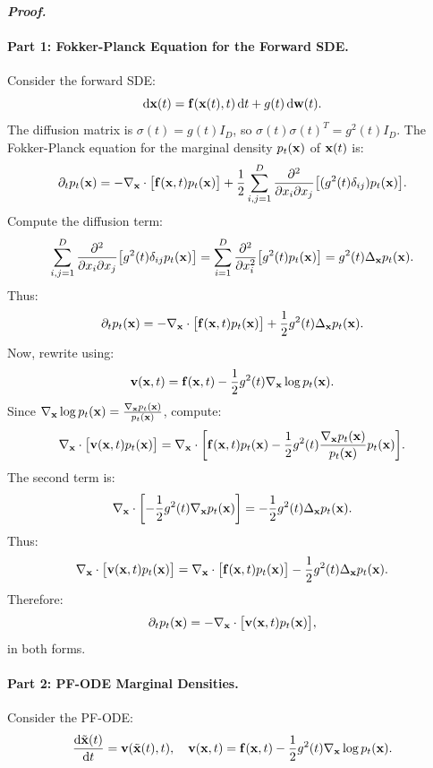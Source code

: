 \paragraph{\textit{Proof.}}
\paragraph{Part 1: Fokker-Planck Equation for the Forward SDE.}

Consider the forward SDE:
\[
\mathop{}\!\mathrm{d} {\mathbf{x}}(t) = {\mathbf{f}}({\mathbf{x}}(t), t)  \mathop{}\!\mathrm{d} t + g(t)  \mathop{}\!\mathrm{d} {\mathbf{w}}(t).
\]
The diffusion matrix is $\sigma(t) = g(t) I_D$, so $\sigma(t) \sigma(t)^T = g^2(t) I_D$. The Fokker-Planck equation for the marginal density $p_t({\mathbf{x}})$ of ${\mathbf{x}}(t)$ is:
\[
\partial_t p_t({\mathbf{x}}) = -\nabla_{{\mathbf{x}}} \cdot \bigl[ {\mathbf{f}}({\mathbf{x}}, t) p_t({\mathbf{x}}) \bigr] + \frac{1}{2} \sum_{i,j=1}^D \frac{\partial^2}{\partial x_i \partial x_j} \bigl[ (g^2(t) \delta_{ij}) p_t({\mathbf{x}}) \bigr].
\]
Compute the diffusion term:
\[
\sum_{i,j=1}^D \frac{\partial^2}{\partial x_i \partial x_j} \bigl[ g^2(t) \delta_{ij} p_t({\mathbf{x}}) \bigr] = \sum_{i=1}^D \frac{\partial^2}{\partial x_i^2} \bigl[ g^2(t) p_t({\mathbf{x}}) \bigr] = g^2(t) \Delta_{{\mathbf{x}}} p_t({\mathbf{x}}).
\]
Thus:
\[
\partial_t p_t({\mathbf{x}}) = -\nabla_{{\mathbf{x}}} \cdot \bigl[ {\mathbf{f}}({\mathbf{x}}, t) p_t({\mathbf{x}}) \bigr] + \frac{1}{2} g^2(t) \Delta_{{\mathbf{x}}} p_t({\mathbf{x}}).
\]
Now, rewrite using:
\[
{\mathbf{v}}({\mathbf{x}}, t) = {\mathbf{f}}({\mathbf{x}}, t) - \frac{1}{2} g^2(t) \nabla_{{\mathbf{x}}} \log p_t({\mathbf{x}}).
\]
Since $\nabla_{{\mathbf{x}}} \log p_t({\mathbf{x}}) = \frac{\nabla_{{\mathbf{x}}} p_t({\mathbf{x}})}{p_t({\mathbf{x}})}$, compute:
\[
\nabla_{{\mathbf{x}}} \cdot \bigl[ {\mathbf{v}}({\mathbf{x}}, t) p_t({\mathbf{x}}) \bigr] = \nabla_{{\mathbf{x}}} \cdot \biggl[ {\mathbf{f}}({\mathbf{x}}, t) p_t({\mathbf{x}}) - \frac{1}{2} g^2(t) \frac{\nabla_{{\mathbf{x}}} p_t({\mathbf{x}})}{p_t({\mathbf{x}})} p_t({\mathbf{x}}) \biggr].
\]
The second term is:
\[
\nabla_{{\mathbf{x}}} \cdot \biggl[ -\frac{1}{2} g^2(t) \nabla_{{\mathbf{x}}} p_t({\mathbf{x}}) \biggr] = -\frac{1}{2} g^2(t) \Delta_{{\mathbf{x}}} p_t({\mathbf{x}}).
\]
Thus:
\[
\nabla_{{\mathbf{x}}} \cdot \bigl[ {\mathbf{v}}({\mathbf{x}}, t) p_t({\mathbf{x}}) \bigr] = \nabla_{{\mathbf{x}}} \cdot \bigl[ {\mathbf{f}}({\mathbf{x}}, t) p_t({\mathbf{x}}) \bigr] - \frac{1}{2} g^2(t) \Delta_{{\mathbf{x}}} p_t({\mathbf{x}}).
\]
Therefore:
\[
\partial_t p_t({\mathbf{x}}) = -\nabla_{{\mathbf{x}}} \cdot \bigl[ {\mathbf{v}}({\mathbf{x}}, t) p_t({\mathbf{x}}) \bigr],
\]
 in both forms.

\paragraph{Part 2: PF-ODE Marginal Densities.}

Consider the PF-ODE:
\[
\frac{\mathop{}\!\mathrm{d} \tilde{{\mathbf{x}}}(t)}{\mathop{}\!\mathrm{d} t} = {\mathbf{v}}(\tilde{{\mathbf{x}}}(t), t), \quad {\mathbf{v}}({\mathbf{x}}, t) = {\mathbf{f}}({\mathbf{x}}, t) - \frac{1}{2} g^2(t) \nabla_{{\mathbf{x}}} \log p_t({\mathbf{x}}).
\]

